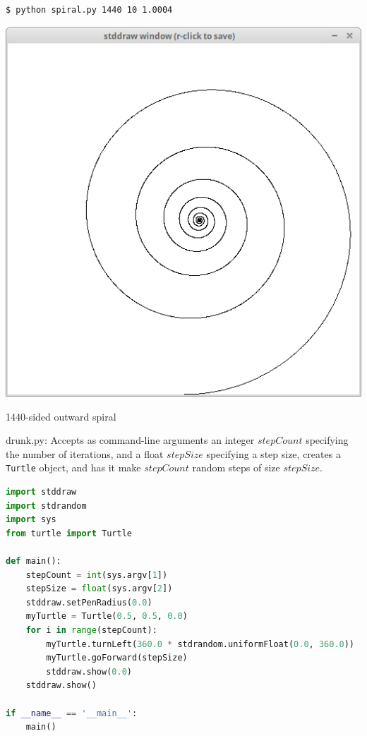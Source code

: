 \documentclass[8pt,a4paper,compress,handout]{beamer}
\begin{document}
\begin{frame}[fragile]
\begin{minipage}{200pt}
\begin{lstlisting}[language={}]
$ python spiral.py 1440 10 1.0004
\end{lstlisting}
\end{minipage}%
\hfill
\begin{minipage}{100pt}
\begin{center}
\includegraphics[scale=0.2]{figures/spiral2.png}

\smallskip

\tiny 1440-sided outward spiral
\end{center}
\end{minipage}
\end{frame}

\begin{frame}[fragile]
\begin{framed}
\tiny drunk.py: Accepts as command-line arguments an integer $stepCount$ specifying the number of iterations, and a float $stepSize$ specifying a step size, creates a \lstinline{Turtle} object, and has it make $stepCount$ random steps of size $stepSize$.
\end{framed}

\begin{lstlisting}[language=Python]
import stddraw
import stdrandom
import sys
from turtle import Turtle

def main():
    stepCount = int(sys.argv[1])
    stepSize = float(sys.argv[2])
    stddraw.setPenRadius(0.0)
    myTurtle = Turtle(0.5, 0.5, 0.0)
    for i in range(stepCount):
        myTurtle.turnLeft(360.0 * stdrandom.uniformFloat(0.0, 360.0))
        myTurtle.goForward(stepSize)
        stddraw.show(0.0)
    stddraw.show()

if __name__ == '__main__':
    main()
\end{lstlisting}
\end{frame}
\end{document}
